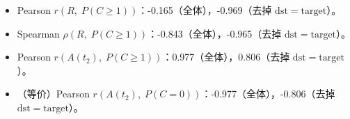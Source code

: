 \begin{itemize}
  \item Pearson $r(R,\;P(C\ge1))$：-0.165（全体），-0.969（去掉 $\mathrm{dst}=\mathrm{target}$）。
  \item Spearman $\rho(R,\;P(C\ge1))$：-0.843（全体），-0.965（去掉 $\mathrm{dst}=\mathrm{target}$）。
  \item Pearson $r(A(t_2),\;P(C\ge1))$：0.977（全体），0.806（去掉 $\mathrm{dst}=\mathrm{target}$）。
  \item （等价）Pearson $r(A(t_2),\;P(C=0))$：-0.977（全体），-0.806（去掉 $\mathrm{dst}=\mathrm{target}$）。
\end{itemize}
